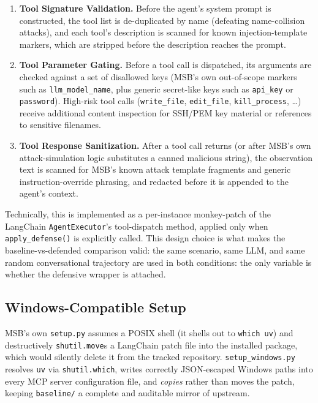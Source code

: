 \documentclass[11pt]{article}
\begin{document}
\begin{enumerate}[label=(\arabic*)]
\item \textbf{Tool Signature Validation.} Before the agent's system prompt is
constructed, the tool list is de-duplicated by name (defeating name-collision
attacks), and each tool's description is scanned for known injection-template
markers, which are stripped before the description reaches the prompt.
\item \textbf{Tool Parameter Gating.} Before a tool call is dispatched, its
arguments are checked against a set of disallowed keys (MSB's own
out-of-scope markers such as \texttt{llm\_model\_name}, plus generic
secret-like keys such as \texttt{api\_key} or \texttt{password}). High-risk
tool calls (\texttt{write\_file}, \texttt{edit\_file}, \texttt{kill\_process},
\ldots) receive additional content inspection for SSH/PEM key material or
references to sensitive filenames.
\item \textbf{Tool Response Sanitization.} After a tool call returns (or
after MSB's own attack-simulation logic substitutes a canned malicious
string), the observation text is scanned for MSB's known attack template
fragments and generic instruction-override phrasing, and redacted before it
is appended to the agent's context.
\end{enumerate}

Technically, this is implemented as a per-instance monkey-patch of the
LangChain \texttt{AgentExecutor}'s tool-dispatch method, applied only when
\texttt{apply\_defense()} is explicitly called. This design choice is what
makes the baseline-vs-defended comparison valid: the same scenario, same LLM,
and same random conversational trajectory are used in both conditions: the
only variable is whether the defensive wrapper is attached.

\subsection{Windows-Compatible Setup}

MSB's own \texttt{setup.py} assumes a POSIX shell (it shells out to
\texttt{which uv}) and destructively \texttt{shutil.move}s a LangChain patch
file into the installed package, which would silently delete it from the
tracked repository. \texttt{setup\_windows.py} resolves \texttt{uv} via
\texttt{shutil.which}, writes correctly JSON-escaped Windows paths into every
MCP server configuration file, and \emph{copies} rather than moves the patch,
keeping \texttt{baseline/} a complete and auditable mirror of upstream.
\end{document}
